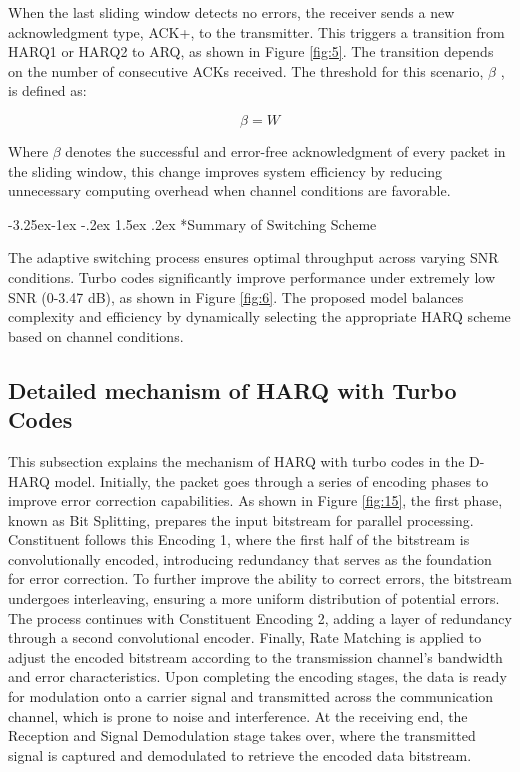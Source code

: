 \documentclass[sn-mathphys-num]{sn-jnl}
\makeatletter
\theoremstyle{thmstyleone}
\theoremstyle{thmstyletwo}%
\theoremstyle{thmstylethree}%
\renewcommand\subsubsection{%
  \@startsection{subsubsection}{3}{\z@}%
  {-3.25ex\@plus -1ex \@minus -.2ex}%
  {1.5ex \@plus .2ex}%
  {\normalfont\normalsize}}
\makeatother
\begin{document}
When the last sliding window detects no errors, the receiver sends a new acknowledgment type, ACK+, to the transmitter. This triggers a transition from HARQ1 or HARQ2 to ARQ, as shown in Figure \ref{fig:5}. The transition depends on the number of consecutive ACKs received. The threshold for this scenario, $\beta$ \cite{r8}, is defined as:

\begin{equation}
\beta = W
\end{equation}

Where $\beta$ denotes the successful and error-free acknowledgment of every packet in the sliding window, this change improves system efficiency by reducing unnecessary computing overhead when channel conditions are favorable.

\subsubsection*{Summary of Switching Scheme}

The adaptive switching process ensures optimal throughput across varying SNR conditions. Turbo codes significantly improve performance under extremely low SNR (0-3.47 dB), as shown in Figure \ref{fig:6}. The proposed model balances complexity and efficiency by dynamically selecting the appropriate HARQ scheme based on channel conditions.

\subsection{Detailed mechanism of HARQ with Turbo Codes} \label{s3.4}

This subsection explains the mechanism of HARQ with turbo codes in the D-HARQ model. Initially, the packet goes through a series of encoding phases to improve error correction capabilities. As shown in Figure \ref{fig:15}, the first phase, known as Bit Splitting, prepares the input bitstream for parallel processing. Constituent follows this Encoding 1, where the first half of the bitstream is convolutionally encoded, introducing redundancy that serves as the foundation for error correction. To further improve the ability to correct errors, the bitstream undergoes interleaving, ensuring a more uniform distribution of potential errors. The process continues with Constituent Encoding 2, adding a layer of redundancy through a second convolutional encoder. Finally, Rate Matching is applied to adjust the encoded bitstream according to the transmission channel's bandwidth and error characteristics. Upon completing the encoding stages, the data is ready for modulation onto a carrier signal and transmitted across the communication channel, which is prone to noise and interference. At the receiving end, the Reception and Signal Demodulation stage takes over, where the transmitted signal is captured and demodulated to retrieve the encoded data bitstream.
\end{document}
